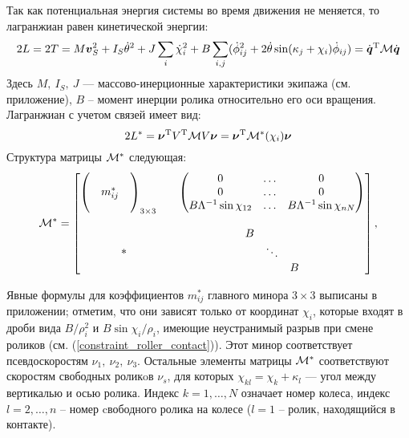 Так как потенциальная энергия системы во время движения не меняется, то лагранжиан  равен кинетической энергии:
\begin{equation}\label{kin_en}
    2L = 2T = M\vec{v}_S^2 + I_S\dot{\theta}^2 + J\sum_i\dot{\chi}_i^2 + B\sum_{i,j}(\dot{\phi}_{ij}^2 + 2\dot{\theta}\sin(\kappa_j + \chi_i)\dot{\phi}_{ij})=\dot{\vec{q}}^\mathrm{T}\M\dot{\vec{q}}
\end{equation}
Здесь $M,\ I_S,\ J$ --- массово-инерционные характеристики экипажа (см. приложение), $B$ -- момент инерции ролика относительно его оси вращения. Лагранжиан с учетом связей имеет вид:
$$ 2L^{*}  = \vec{\nu}^\mathrm{T} V^\mathrm{T}\M V\vec{\nu} = \vec{\nu}^\mathrm{T} \M^*(\chi_i)\vec{\nu} $$
Структура матрицы $\mathcal{M}^*$ следующая:
$$
\mathcal{M}^* = \begin{bmatrix}
        \left(\begin{matrix}&&\\&m^*_{ij}&\\&&\end{matrix}\right)_{3\times3} \quad & \left(\begin{matrix} 0&\ldots& 0 \\ 0&\ldots&0 \\ B\Lambda^{-1}\sin\chi_{12}&\ldots& B\Lambda^{-1}\sin\chi_{nN} \end{matrix}\right) \\[25pt]
        *          & \begin{matrix} B & & \\ & \ddots & \\ & & B \end{matrix} \\
    \end{bmatrix},
$$

Явные формулы для коэффициентов $m^*_{ij}$ главного минора $3\times3$ выписаны в приложении; отметим, что они зависят только от координат $\chi_i$, которые входят в дроби вида $B/\rho_i^2$ и $B\sin\chi_i/\rho_i$, имеющие неустранимый разрыв при смене роликов (см. (\ref{constraint_roller_contact})). Этот минор соответствует псевдоскоростям $\nu_1,\ \nu_2,\ \nu_3$. Остальные элементы матрицы $\mathcal{M}^*$
соответствуют скоростям свободных роликoв $\nu_s$, для которых $\chi_{kl} = \chi_k+\kappa_l$ --- угол между вертикалью и осью ролика. Индекс $k = 1,\dots,N$ означает номер колеса, индекс $l = 2,\ldots, n$ -- номер cвободного ролика на колесе ($l = 1$ -- ролик, находящийся в контакте).
 
